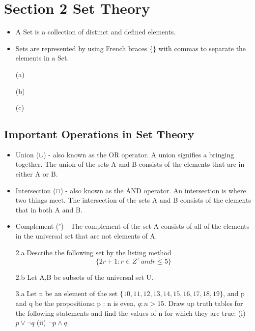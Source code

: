\documentclass[MASTER.tex]{subfiles}
\begin{document}

\section{Section 2 Set Theory}

\begin{itemize}
\item A Set is a collection of distinct and defined elements. 
\item Sets are represented by using French braces $\{ \}$ with commas to separate the elements in a Set. 
\end{itemize}

\begin{itemize}

\item[(a)] 

\item[(b)]

\item[(c)]

\end{itemize}

\subsection{Important Operations in Set Theory}

\begin{itemize}
\item Union ($\cup$) - also known as the OR operator. A union signifies a bringing together. The union of the sets A and B consists of the elements that are in either A or B.
\item Intersection ($\cap$) - also known as the AND operator. An intersection is where two things meet. The intersection of the sets A and B consists of the elements that in both A and B.
\item Complement ($^{c}$) - The complement of the set A consists of all of the elements in the universal set that are not elements of A.
\end{itemize}

\begin{itemize}
\item[2.a] Describe the following set by the listing method
\[ \{ 2r+1 : r \in Z^{+} and r \leq 5  \} \]
\item[2.b] Let A,B be subsets of the universal set U.


\end{itemize}
\begin{itemize}
\item[3.a]
Let n be an element of the set $\{10, 11, 12, 13, 14, 15, 16, 17, 18, 19\}$,
and p and q be the propositions:
p : n is even, $q : n > 15$.
Draw up truth tables for the following statements and find the values of n for
which they are true:
(i) $p \vee \neg q$
(ii) $\neg p \wedge q$
\end{itemize}
\end{document}
